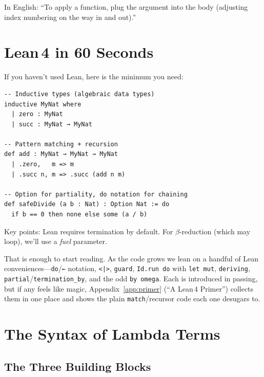 \documentclass[11pt,a4paper]{article}
\theoremstyle{definition}
\begin{document}
\medskip\noindent
In English: ``To apply a function, plug the argument into the body (adjusting
index numbering on the way in and out).''

\section{Lean\,4 in 60 Seconds}\label{sec:lean}

If you haven't used Lean, here is the minimum you need:

\begin{verbatim}
-- Inductive types (algebraic data types)
inductive MyNat where
  | zero : MyNat
  | succ : MyNat → MyNat

-- Pattern matching + recursion
def add : MyNat → MyNat → MyNat
  | .zero,   m => m
  | .succ n, m => .succ (add n m)

-- Option for partiality, do notation for chaining
def safeDivide (a b : Nat) : Option Nat := do
  if b == 0 then none else some (a / b)
\end{verbatim}

Key points: Lean requires termination by default. For $\beta$-reduction (which
may loop), we'll use a \textit{fuel} parameter.

That is enough to start reading. As the code grows we lean on a handful of
Lean conveniences---\texttt{do}/\texttt{←} notation, \texttt{<|>},
\texttt{guard}, \texttt{Id.run do} with \texttt{let mut}, \texttt{deriving},
\texttt{partial}/\texttt{termination\_by}, and the odd \texttt{by omega}. Each
is introduced in passing, but if any feels like magic, Appendix~\ref{app:primer}
(``A Lean\,4 Primer'') collects them in one place and shows the plain
\texttt{match}/recursor code each one desugars to.

\section{The Syntax of Lambda Terms}\label{sec:syntax}

\subsection{The Three Building Blocks}
\end{document}
